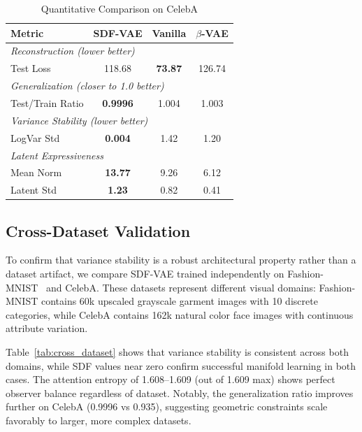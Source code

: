 \documentclass[10pt,twocolumn,letterpaper]{article}
\newcommand{\toprule}{\hline\hline}
\newcommand{\midrule}{\hline}
\newcommand{\bottomrule}{\hline\hline}
\begin{document}
\begin{table}[t]
\centering
\caption{Quantitative Comparison on CelebA}
\label{tab:quantitative}
\small
\begin{tabular}{lccc}
\toprule
\textbf{Metric} & \textbf{SDF-VAE} & \textbf{Vanilla} & \textbf{$\beta$-VAE} \\
\midrule
\multicolumn{4}{l}{\textit{Reconstruction (lower better)}} \\
Test Loss & 118.68 & \textbf{73.87} & 126.74 \\
\midrule
\multicolumn{4}{l}{\textit{Generalization (closer to 1.0 better)}} \\
Test/Train Ratio & \textbf{0.9996} & 1.004 & 1.003 \\
\midrule
\multicolumn{4}{l}{\textit{Variance Stability (lower better)}} \\
LogVar Std & \textbf{0.004} & 1.42 & 1.20 \\
\midrule
\multicolumn{4}{l}{\textit{Latent Expressiveness}} \\
Mean Norm & \textbf{13.77} & 9.26 & 6.12 \\
Latent Std & \textbf{1.23} & 0.82 & 0.41 \\
\bottomrule
\end{tabular}
\end{table}

\subsection{Cross-Dataset Validation}
\label{sec:cross_dataset}

To confirm that variance stability is a robust architectural property rather than a dataset artifact, we compare SDF-VAE trained independently on Fashion-MNIST~\cite{xiao2017fashion} and CelebA. These datasets represent different visual domains: Fashion-MNIST contains 60k upscaled grayscale garment images with 10 discrete categories, while CelebA contains 162k natural color face images with continuous attribute variation.

Table~\ref{tab:cross_dataset} shows that variance stability is consistent across both domains, while SDF values near zero confirm successful manifold learning in both cases. The attention entropy of 1.608--1.609 (out of 1.609 max) shows perfect observer balance regardless of dataset. Notably, the generalization ratio improves further on CelebA (0.9996 vs 0.935), suggesting geometric constraints scale favorably to larger, more complex datasets.
\end{document}
